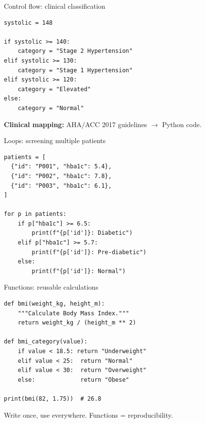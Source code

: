\documentclass[aspectratio=169,11pt]{beamer}
\begin{document}
\begin{frame}[fragile]{Control flow: clinical classification}
\begin{verbatim}
systolic = 148

if systolic >= 140:
    category = "Stage 2 Hypertension"
elif systolic >= 130:
    category = "Stage 1 Hypertension"
elif systolic >= 120:
    category = "Elevated"
else:
    category = "Normal"
\end{verbatim}

\vspace{4pt}
\textbf{Clinical mapping:} AHA/ACC 2017 guidelines $\to$ Python code.
\end{frame}

\begin{frame}[fragile]{Loops: screening multiple patients}
\begin{verbatim}
patients = [
  {"id": "P001", "hba1c": 5.4},
  {"id": "P002", "hba1c": 7.8},
  {"id": "P003", "hba1c": 6.1},
]

for p in patients:
    if p["hba1c"] >= 6.5:
        print(f"{p['id']}: Diabetic")
    elif p["hba1c"] >= 5.7:
        print(f"{p['id']}: Pre-diabetic")
    else:
        print(f"{p['id']}: Normal")
\end{verbatim}
\end{frame}

\begin{frame}[fragile]{Functions: reusable calculations}
\begin{verbatim}
def bmi(weight_kg, height_m):
    """Calculate Body Mass Index."""
    return weight_kg / (height_m ** 2)

def bmi_category(value):
    if value < 18.5: return "Underweight"
    elif value < 25:  return "Normal"
    elif value < 30:  return "Overweight"
    else:             return "Obese"

print(bmi(82, 1.75))  # 26.8
\end{verbatim}

\vspace{4pt}
Write once, use everywhere. \alert{Functions = reproducibility.}
\end{frame}
\end{document}
